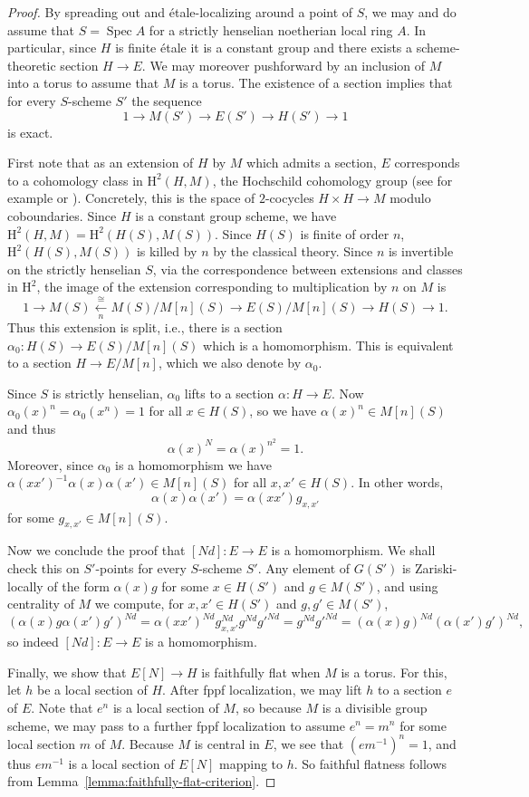 \documentclass[11pt, letterpaper,english]{amsart}
\theoremstyle{plain}
\theoremstyle{definition}
\numberwithin{equation}{section}
\numberwithin{lem}{section}
\DeclareMathOperator{\Spec}{Spec}
\begin{document}
\begin{proof}
By spreading out and \'{e}tale-localizing around a point of $S$, we may and do assume that $S = \Spec A$ for a strictly henselian noetherian local ring $A$. 
In particular, since $H$ is finite \'{e}tale it is a constant group and there exists a scheme-theoretic section $H \to E$. We may moreover pushforward by an inclusion of $M$ into a torus to assume that $M$ is a torus. The existence of a section implies that for every $S$-scheme $S'$ the sequence
\[
1 \to M(S') \to E(S') \to H(S') \to 1
\]
is exact. 

First note that as an extension of $H$ by $M$ which admits a section, $E$ corresponds to a cohomology class in $\mathrm{H}^2(H, M)$, the Hochschild cohomology group (see for example \cite[II, \S 3, Prop.\ 2.3]{DG} or \cite[Prop.\ 2.3.6]{Demarche}). Concretely, this is the space of $2$-cocycles $H \times H \to M$ modulo coboundaries. Since $H$ is a constant group scheme, we have $\mathrm{H}^2(H, M) = \mathrm{H}^2(H(S), M(S))$. Since $H(S)$ is finite of order $n$, $\mathrm{H}^2(H(S), M(S))$ is killed by $n$ by the classical theory. Since $n$ is invertible on the strictly henselian $S$, via the correspondence between extensions and classes in $\mathrm{H}^2$, the image of the extension corresponding to multiplication by $n$ on $M$ is
\[
1 \to M(S) \xleftarrow[n]{\cong} M(S)/M[n](S) \to E(S)/M[n](S) \to H(S) \to 1.
\]
Thus this extension is split, i.e., there is a section $\alpha_0: H(S) \to E(S)/M[n](S)$ which is a homomorphism. This is equivalent to a section $H \to E/M[n]$, which we also denote by $\alpha_0$. 

Since $S$ is strictly henselian, $\alpha_0$ lifts to a section $\alpha: H \to E$. Now $\alpha_0(x)^n = \alpha_0(x^n) = 1$ for all $x \in H(S)$, so we have $\alpha(x)^n \in M[n](S)$ and thus
\[
\alpha(x)^N = \alpha(x)^{n^2} = 1.
\]
Moreover, since $\alpha_0$ is a homomorphism we have $\alpha(xx')^{-1}\alpha(x)\alpha(x') \in M[n](S)$ for all $x, x' \in H(S)$. In other words,
\[
\alpha(x)\alpha(x') = \alpha(xx') g_{x, x'}
\]
for some $g_{x, x'} \in M[n](S)$. 

Now we conclude the proof that $[Nd]: E \to E$ is a homomorphism. We shall check this on $S'$-points for every $S$-scheme $S'$. Any element of $G(S')$ is Zariski-locally of the form $\alpha(x)g$ for some $x \in H(S')$ and $g \in M(S')$, and using centrality of $M$ we compute, for $x, x' \in H(S')$ and $g, g' \in M(S')$,
\[
(\alpha(x)g\alpha(x')g')^{Nd} = \alpha(xx')^{Nd}g_{x, x'}^{Nd} g^{Nd} g'^{Nd} = g^{Nd} g'^{Nd} = (\alpha(x) g)^{Nd} (\alpha(x') g')^{Nd},
\]
so indeed $[Nd]: E \to E$ is a homomorphism. 

Finally, we show that $E[N] \to H$ is faithfully flat when $M$ is a torus. For this, let $h$ be a local section of $H$. After fppf localization, we may lift $h$ to a section $e$ of $E$. Note that $e^n$ is a local section of $M$, so because $M$ is a divisible group scheme, we may pass to a further fppf localization to assume $e^n = m^n$ for some local section $m$ of $M$. Because $M$ is central in $E$, we see that $(em^{-1})^n = 1$, and thus $em^{-1}$ is a local section of $E[N]$ mapping to $h$. So faithful flatness follows from Lemma~\ref{lemma:faithfully-flat-criterion}.
\end{proof}
\end{document}
